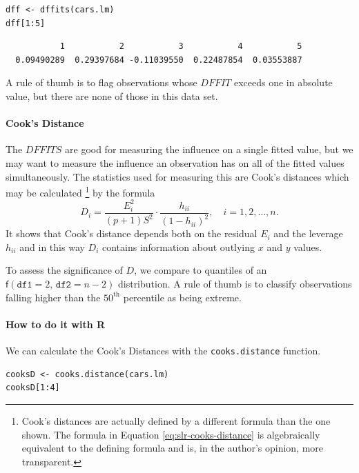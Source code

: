 \documentclass[captions=tableheading]{scrbook}
\begin{document}
\begin{verbatim}
dff <- dffits(cars.lm)
dff[1:5]
\end{verbatim}

\begin{verbatim}
           1           2           3           4           5 
  0.09490289  0.29397684 -0.11039550  0.22487854  0.03553887
\end{verbatim}

A rule of thumb is to flag observations whose \(DFFIT\) exceeds one in absolute value, but there are none of those in this data set.

\paragraph*{Cook's Distance}

The \(DFFITS\) are good for measuring the influence on a single fitted value, but we may want to measure the influence an observation has on all of the fitted values simultaneously. The statistics used for measuring this are Cook's distances which may be calculated
\footnote{Cook's distances are actually defined by a different formula than the one shown. The formula in Equation \ref{eq:slr-cooks-distance} is algebraically equivalent to the defining formula and is, in the author's opinion, more transparent.}
by the formula
\begin{equation}
D_{i}=\frac{E_{i}^{2}}{(p+1)S^{2}}\cdot\frac{h_{ii}}{(1-h_{ii})^{2}},\quad i=1,2,\ldots,n.\label{eq:slr-cooks-distance}
\end{equation}
It shows that Cook's distance depends both on the residual \(E_{i}\) and the leverage \(h_{ii}\) and in this way \(D_{i}\) contains information about outlying \(x\) and \(y\) values.

To assess the significance of \(D\), we compare to quantiles of an \(\mathsf{f}(\mathtt{df1}=2,\,\mathtt{df2}=n-2)\) distribution. A rule of thumb is to classify observations falling higher than the \(50^{\mathrm{th}}\) percentile as being extreme. 

\paragraph*{How to do it with \textsf{R}}

We can calculate the Cook's Distances with the \texttt{cooks.distance} function.


\begin{verbatim}
cooksD <- cooks.distance(cars.lm)
cooksD[1:4]
\end{verbatim}
\end{document}
